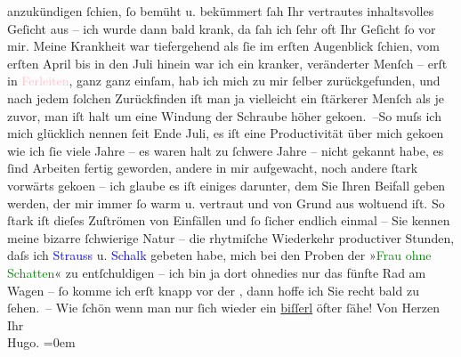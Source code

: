                anzukündigen ſchien, ſo bemüht u. bekümmert ſah Ihr vertrautes inhaltsvolles Geſicht
               aus – ich wurde dann bald krank, da ſah ich ſehr oft Ihr Geſicht ſo vor mir. Meine
               Krankheit war tiefergehend als ſie im erſten Augenblick ſchien, vom erſten
                  April bis in den Juli hinein war ich ein kranker, veränderter
               Menſch – erſt in \textcolor{pink}{Ferleiten}{}\ledrightnote{\textcolor{pink}{Ferleiten}}, ganz ganz einſam, hab
               ich mich zu mir ſelber {\pb}zurückgefunden, und nach jedem ſolchen Zurückfinden iſt man ja vielleicht ein
               ſtärkerer Menſch als je zuvor, man iſt halt um eine Windung der Schraube höher geko{\geminationm}en. –\hspace*{1.5em}So muſs ich mich
               glücklich nennen ſeit Ende Juli, es iſt eine Productivität über mich
                  geko{\geminationm}en wie ich ſie viele Jahre – es waren halt zu
               ſchwere Jahre – nicht gekannt habe, es ſind Arbeiten fertig geworden, andere in mir
               aufgewacht, noch andere ſtark vorwärts geko{\geminationm}en – ich
               glaube es iſt einiges darunter, dem Sie Ihren Beifall geben werden, der mir immer ſo
               warm u. vertraut und von Grund aus woltuend iſt.\pend
           \pstart
           So ſtark iſt dieſes Zuſtrömen von Einfällen und ſo ſicher endlich einmal – Sie kennen
               meine bizarre ſchwierige Natur – die rhytmiſche Wiederkehr productiver Stunden, daſs
               ich \textcolor{blue}{Strauss}{}\ledrightnote{\textcolor{blue}{Richard Strauss}} u. \textcolor{blue}{Schalk}{}\ledrightnote{\textcolor{blue}{Franz Schalk}} gebeten habe, mich bei den Proben der »\textcolor{green}{Frau ohne Schatten}{}\ledrightnote{\textcolor{green}{Die Frau ohne Schatten. Erzählung}}« zu entſchuldigen – ich bin ja dort ohnedies nur das
               fünfte Rad am Wagen – ſo komme ich erſt knapp vor der \label{K_L02326_2v}\label{K_L02326_2h}, dann hoffe ich Sie recht bald zu ſehen. – Wie ſchön
               wenn man nur ſich wieder ein \uline{biſſerl} öfter ſähe! \pend
           \pstart
           Von Herzen Ihr{\\[\baselineskip]}\spacefill\mbox{Hugo.}\pend
           \leftskip=0em{}\endnumbering{}  
      